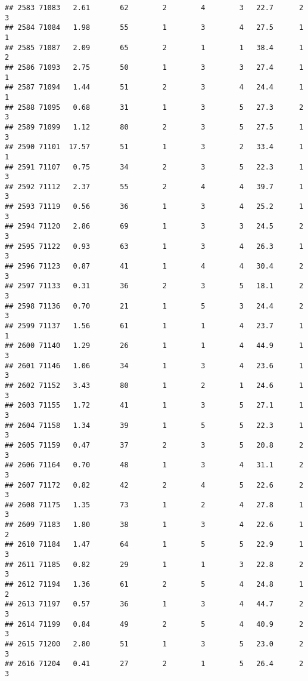 \documentclass[
]{article}
\begin{document}
\begin{verbatim}
## 2583 71083   2.61       62        2        4        3   22.7      2      3
## 2584 71084   1.98       55        1        3        4   27.5      1      1
## 2585 71087   2.09       65        2        1        1   38.4      1      2
## 2586 71093   2.75       50        1        3        3   27.4      1      1
## 2587 71094   1.44       51        2        3        4   24.4      1      1
## 2588 71095   0.68       31        1        3        5   27.3      2      3
## 2589 71099   1.12       80        2        3        5   27.5      1      3
## 2590 71101  17.57       51        1        3        2   33.4      1      1
## 2591 71107   0.75       34        2        3        5   22.3      1      3
## 2592 71112   2.37       55        2        4        4   39.7      1      3
## 2593 71119   0.56       36        1        3        4   25.2      1      3
## 2594 71120   2.86       69        1        3        3   24.5      2      3
## 2595 71122   0.93       63        1        3        4   26.3      1      3
## 2596 71123   0.87       41        1        4        4   30.4      2      3
## 2597 71133   0.31       36        2        3        5   18.1      2      3
## 2598 71136   0.70       21        1        5        3   24.4      2      3
## 2599 71137   1.56       61        1        1        4   23.7      1      1
## 2600 71140   1.29       26        1        1        4   44.9      1      3
## 2601 71146   1.06       34        1        3        4   23.6      1      3
## 2602 71152   3.43       80        1        2        1   24.6      1      3
## 2603 71155   1.72       41        1        3        5   27.1      1      3
## 2604 71158   1.34       39        1        5        5   22.3      1      3
## 2605 71159   0.47       37        2        3        5   20.8      2      3
## 2606 71164   0.70       48        1        3        4   31.1      2      3
## 2607 71172   0.82       42        2        4        5   22.6      2      3
## 2608 71175   1.35       73        1        2        4   27.8      1      3
## 2609 71183   1.80       38        1        3        4   22.6      1      2
## 2610 71184   1.47       64        1        5        5   22.9      1      3
## 2611 71185   0.82       29        1        1        3   22.8      2      3
## 2612 71194   1.36       61        2        5        4   24.8      1      2
## 2613 71197   0.57       36        1        3        4   44.7      2      3
## 2614 71199   0.84       49        2        5        4   40.9      2      3
## 2615 71200   2.80       51        1        3        5   23.0      2      3
## 2616 71204   0.41       27        2        1        5   26.4      2      3

\end{verbatim}
\end{document}
